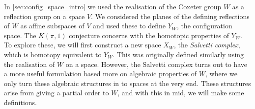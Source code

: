 \documentclass[class=article, crop=false]{standalone}
\begin{document}
In \cref{sec:config_space_intro} we used the realisation of the Coxeter group $W$ as a reflection group on a space $V$. We considered the planes of the defining reflections of $W$ as affine subspaces of $V$ and used these to define $Y_W$, the configuration space. The $K(\pi,1)$ conjecture concerns with the homotopic properties of $Y_W$. To explore these, we will first construct a new space $X_W$, the \emph{Salvetti complex}, which is homotopy equivalent to $Y_W$. This was originally defined \cite{salvetti_topology_1987, salvetti_homotopy_1994} similarly using the realisation of $W$ on a space. However, the Salvetti complex turns out to have a more useful formulation based more on algebraic properties of $W$, where we only turn these algebraic structures in to spaces at the very end. These structures arise from giving a partial order to $W$, and with this in mid, we will make some definitions. 
\end{document}
